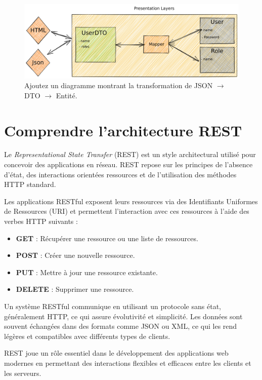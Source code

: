 \documentclass[a4paper,12pt]{article}
\begin{document}
\noindent\begin{figure}[h!]
    \centering
    \includegraphics[width=\textwidth]{images/layers-4.jpg}
    \caption{Ajoutez un diagramme montrant la transformation de JSON $\rightarrow$ DTO $\rightarrow$ Entité.}
    \label{fig:Transformation_JSON_DTO_Entity_diagram}
\end{figure}

\section{Comprendre l'architecture REST}

Le \textit{Representational State Transfer} (REST) est un style architectural utilisé pour concevoir des applications en réseau. REST repose sur les principes de l'absence d'état, des interactions orientées ressources et de l'utilisation des méthodes HTTP standard.

Les applications RESTful exposent leurs ressources via des Identifiants Uniformes de Ressources (URI) et permettent l'interaction avec ces ressources à l'aide des verbes HTTP suivants :
\begin{itemize}
    \item \textbf{GET} : Récupérer une ressource ou une liste de ressources.
    \item \textbf{POST} : Créer une nouvelle ressource.
    \item \textbf{PUT} : Mettre à jour une ressource existante.
    \item \textbf{DELETE} : Supprimer une ressource.
\end{itemize}

Un système RESTful communique en utilisant un protocole sans état, généralement HTTP, ce qui assure évolutivité et simplicité. Les données sont souvent échangées dans des formats comme JSON ou XML, ce qui les rend légères et compatibles avec différents types de clients.

REST joue un rôle essentiel dans le développement des applications web modernes en permettant des interactions flexibles et efficaces entre les clients et les serveurs.
\end{document}
